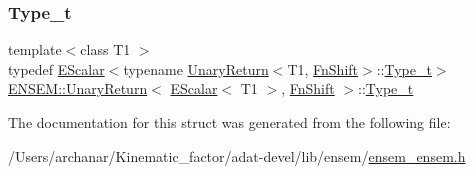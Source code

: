 \mbox{\label{structENSEM_1_1UnaryReturn_3_01EScalar_3_01T1_01_4_00_01FnShift_01_4_a36d8927b4e6f9ea44292d01926dc292a}} 
\subsubsection{\texorpdfstring{Type\_t}{Type\_t}\hspace{0.1cm}{\footnotesize\ttfamily [3/3]}}
{\footnotesize\ttfamily template$<$class T1 $>$ \\
typedef \mbox{\hyperlink{classENSEM_1_1EScalar}{E\+Scalar}}$<$typename \mbox{\hyperlink{structENSEM_1_1UnaryReturn}{Unary\+Return}}$<$T1, \mbox{\hyperlink{structENSEM_1_1FnShift}{Fn\+Shift}}$>$\+::\mbox{\hyperlink{structENSEM_1_1UnaryReturn_3_01EScalar_3_01T1_01_4_00_01FnShift_01_4_a36d8927b4e6f9ea44292d01926dc292a}{Type\+\_\+t}}$>$ \mbox{\hyperlink{structENSEM_1_1UnaryReturn}{E\+N\+S\+E\+M\+::\+Unary\+Return}}$<$ \mbox{\hyperlink{classENSEM_1_1EScalar}{E\+Scalar}}$<$ T1 $>$, \mbox{\hyperlink{structENSEM_1_1FnShift}{Fn\+Shift}} $>$\+::\mbox{\hyperlink{structENSEM_1_1UnaryReturn_3_01EScalar_3_01T1_01_4_00_01FnShift_01_4_a36d8927b4e6f9ea44292d01926dc292a}{Type\+\_\+t}}}



The documentation for this struct was generated from the following file\+:\begin{DoxyCompactItemize}
\item 
/\+Users/archanar/\+Kinematic\+\_\+factor/adat-\/devel/lib/ensem/\mbox{\hyperlink{adat-devel_2lib_2ensem_2ensem__ensem_8h}{ensem\+\_\+ensem.\+h}}\end{DoxyCompactItemize}
